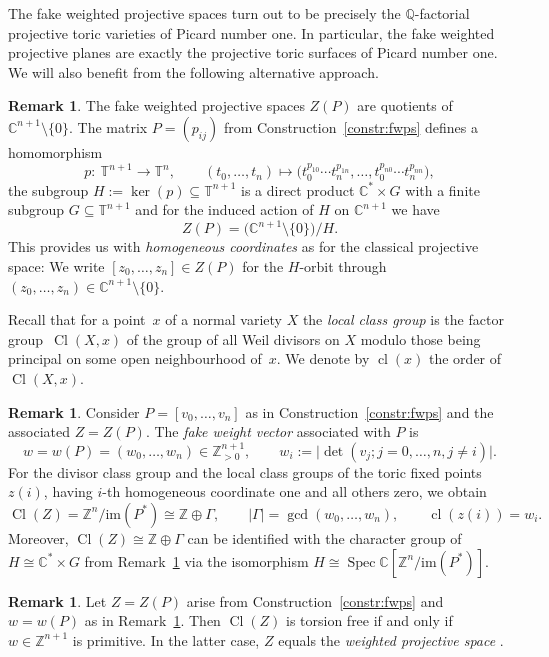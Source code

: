 \documentclass[pdftex]{sigma}
\theoremstyle{definition}
\newtheorem{rem}[thm]{Remark}
\def\CC{{\mathbb C}}
\def\TT{{\mathbb T}}
\def\ZZ{{\mathbb Z}}
\def\QQ{{\mathbb Q}}
\def\PP{{\mathbb P}}
\DeclareMathOperator{\Cl}{Cl}
\DeclareMathOperator{\cl}{cl}
\DeclareMathOperator{\Spec}{Spec}
\begin{document}
The fake weighted projective spaces turn out to be
precisely the $\QQ$-factorial projective toric
varieties of Picard number one.
In particular, the fake weighted projective
planes are exactly the projective toric surfaces
of Picard number one.
We will also benefit from the following alternative
approach.

\begin{rem}\label{rem:fwpsasquots}
The fake weighted projective spaces $Z(P)$ are quotients
of $\CC^{n+1} \setminus \{0\}$. The matrix $P=(p_{ij})$
from Construction~\ref{constr:fwps} defines a homomorphism
\[
p \colon \ \TT^{n+1} \to \TT^n,
\qquad
(t_0,\dots,t_n)
 \mapsto
\bigl(t_0^{p_{10}} \cdots t_n^{p_{1n}}, \dots , t_0^{p_{n0}} \cdots t_n^{p_{nn}}\bigr),
\]
the subgroup $H := \ker(p) \subseteq \TT^{n+1}$ is a
direct product $\CC^* \times G$ with a finite
subgroup $G \subseteq \TT^{n+1}$ and for the
induced action of $H$ on $\CC^{n+1}$ we have
\[
Z(P) = \bigl(\CC^{n+1} \setminus\{0\}\bigr) / H.
\]
This provides us with \emph{homogeneous coordinates}
as for the classical projective space:
We write $[z_0,\dots, z_n] \in Z(P)$ for the
$H$-orbit through
$(z_0,\dots, z_n) \in \CC^{n+1} \setminus \{0\}$.
\end{rem}


Recall that for a point~$x$ of a normal variety $X$
the \emph{local class group} is the factor group~$\Cl(X,x)$
of the group of all Weil divisors on $X$
modulo those being principal on some open
neighbourhood of~$x$. We denote by $\cl(x)$ the
order of $\Cl(X,x)$.


\begin{rem}
\label{rem:fakewv}
Consider $P = [v_0, \dots, v_n]$ as in
Construction~\ref{constr:fwps} and
the associated $Z=Z(P)$.
The \emph{fake weight vector} associated
with $P$ is
\[
w
=
w(P)
=
(w_0,\dots,w_n)
\in
\ZZ_{>0}^{n+1},
\qquad
w_i := \vert {\det}(v_j; j = 0,\dots,n, j \ne i) \vert.
\]
For the divisor class group and the local class groups
of the toric fixed points $z(i)$, having $i$-th
homogeneous coordinate one and all others zero,
we obtain
\[
\Cl(Z) = \ZZ^n / \mathrm{im}(P^*) \cong \ZZ \oplus \Gamma,
\qquad
\vert \Gamma \vert = \gcd(w_0,\dots,w_n),
\qquad
\cl(z(i)) = w_i.
\]
Moreover, $\Cl(Z) \cong \ZZ \oplus \Gamma$ can
be identified with the character group of
$H \cong \CC^* \times G$ from
Remark~\ref{rem:fwpsasquots} via the isomorphism
$H \cong \Spec \CC[\ZZ^n / \mathrm{im}(P^*)]$.
\end{rem}

\begin{rem}Let $Z=Z(P)$ arise from Construction~\ref{constr:fwps}
and $w = w(P)$ as in Remark~\ref{rem:fakewv}.
Then $\Cl(Z)$ is torsion free if and
only if $w \in \ZZ^{n+1}$ is primitive.
In the latter case, $Z$ equals the
\emph{weighted projective space}
\smash{$\PP_{(w_0, \dots, w_n)}$}.
\end{rem}
\end{document}
